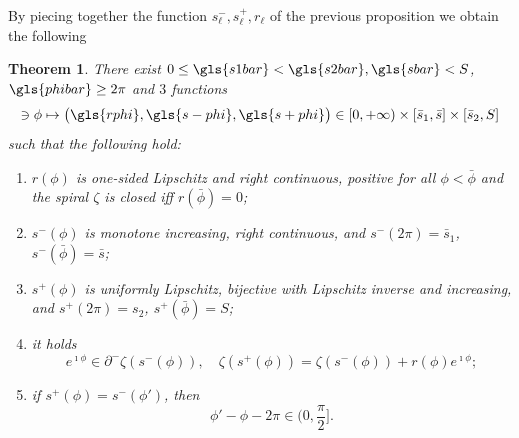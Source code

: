\documentclass[reqno]{amsart}
\theoremstyle{definition} \newtheorem{definition}{Definition}[section]
\theoremstyle{definition} \newtheorem{remark}[definition]{Remark}
\theoremstyle{plain} \newtheorem{lemma}[definition]{Lemma}
\theoremstyle{plain} \newtheorem{proposition}[definition]{Proposition}
\theoremstyle{plain} \newtheorem{theorem}[definition]{Theorem}
\theoremstyle{plain} \newtheorem{corollary}[definition]{Corollary}
\theoremstyle{definition} \newtheorem{example}[definition]{Example}
\theoremstyle{plain} \newtheorem{claim}[clai]{Claim}
\theoremstyle{definition} \newtheorem{assumption}[definition]{Assumption}
\theoremstyle{definition} \newtheorem{observation}[definition]{Observation}
\newcommand{\1}{\mathbbm 1}
\renewcommand{\i}{\imath}
\numberwithin{equation}{section} %
\theoremstyle{plain} \newtheorem*{theorem*}{Theorem}
\theoremstyle{plain} \newtheorem{mthm}[maintheorem]{Main Theorem}
\theoremstyle{plain} \newtheorem*{mthm*}{Main Theorem}
\theoremstyle{plain} \newtheorem*{conjecture*}{Conjecture}
\theoremstyle{plain} \newtheorem{conjecture}[definition]{Conjecture}
\theoremstyle{plain} \newtheorem*{problem*}{Problem}
\begin{document}
By piecing together the function $s^-_\ell,s^+_\ell, r_\ell$ of the previous proposition we obtain the following

\begin{theorem}
\label{Cor:angle_preprest}
There exist    $0 \leq \gls{s1bar} < \gls{s2bar},\gls{sbar} < S$,  $\gls{phibar} \geq 2\pi$ and $3$ functions   
\begin{equation*}
[2\pi,\bar \phi] \ni \phi \mapsto \big( \gls{rphi}, \gls{s-phi}, \gls{s+phi} \big) \in [0,+\infty) \times [\bar s_1, \bar s] \times [\bar s_2, S]
\end{equation*}
such that the following hold:
\begin{enumerate}
\item $r(\phi)$ is one-sided Lipschitz and right continuous, positive for all $\phi < \bar 
\phi$ and the spiral $\zeta$ is closed iff $r(\bar \phi) = 0$;
\item $s^-(\phi)$ is monotone increasing, right continuous, and $s^-(2\pi) = \bar s_1$, $s^-(\bar \phi) = \bar s$;
\item $s^+(\phi)$ is uniformly Lipschitz, bijective with Lipschitz inverse and increasing, and $s^+(2\pi) = s_2$, $s^+(\bar \phi) = S$;
\item it holds
\begin{equation*}
e^{\i \phi} \in \partial^- \zeta(s^-(\phi)), \quad \zeta(s^+(\phi)) = \zeta(s^-(\phi)) + r(\phi) e^{\i \phi};
\end{equation*}
\item if $s^+(\phi) = s^-(\phi')$, then
\begin{equation*}
\phi' - \phi - 2\pi \in \bigg( 0, \frac{\pi}{2} \bigg]. 
\end{equation*}
\end{enumerate}
\end{theorem}
\end{document}
